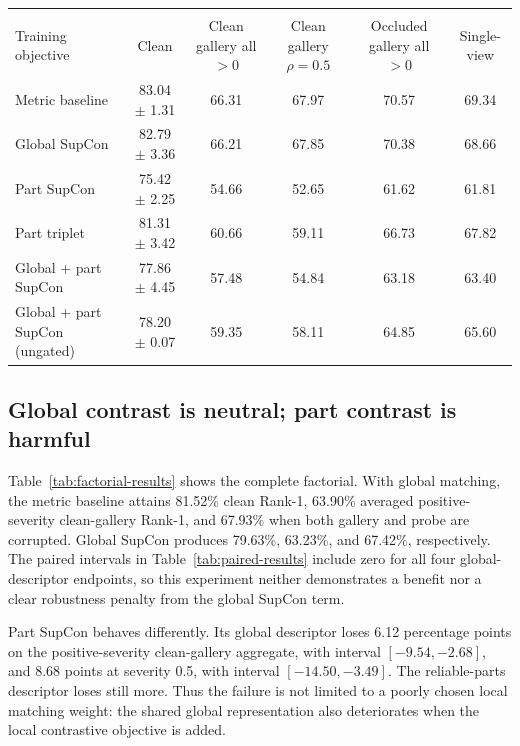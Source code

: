 \documentclass[runningheads]{llncs}
\begin{document}
\begin{table}[!t]
\begin{tabularx}{\textwidth}{@{}>{\raggedright\arraybackslash}Xccccc@{}}
\toprule
\multicolumn{6}{@{}l}{\emph{Reliable-parts descriptor}} \\
Training objective & Clean & \shortstack{Clean gallery\\all $>0$} &
\shortstack{Clean gallery\\$\rho=0.5$} & \shortstack{Occluded gallery\\all $>0$} &
Single-view \\
\midrule
Metric baseline & 83.04 $\pm$ 1.31 & 66.31 & 67.97 & 70.57 & 69.34 \\
Global SupCon & 82.79 $\pm$ 3.36 & 66.21 & 67.85 & 70.38 & 68.66 \\
Part SupCon & 75.42 $\pm$ 2.25 & 54.66 & 52.65 & 61.62 & 61.81 \\
Part triplet & 81.31 $\pm$ 3.42 & 60.66 & 59.11 & 66.73 & 67.82 \\
Global + part SupCon & 77.86 $\pm$ 4.45 & 57.48 & 54.84 & 63.18 & 63.40 \\
Global + part SupCon (ungated) & 78.20 $\pm$ 0.07 & 59.35 & 58.11 & 64.85 & 65.60 \\
\bottomrule
\end{tabularx}
\end{table}

\subsection{Global contrast is neutral; part contrast is harmful}

Table~\ref{tab:factorial-results} shows the complete factorial. With global
matching, the metric baseline attains 81.52\% clean Rank-1, 63.90\% averaged
positive-severity clean-gallery Rank-1, and 67.93\% when both gallery and probe
are corrupted. Global SupCon produces 79.63\%, 63.23\%, and 67.42\%,
respectively. The paired intervals in Table~\ref{tab:paired-results} include
zero for all four global-descriptor endpoints, so this experiment neither
demonstrates a benefit nor a clear robustness penalty from the global SupCon
term.

Part SupCon behaves differently. Its global descriptor loses 6.12 percentage
points on the positive-severity clean-gallery aggregate, with interval
$[-9.54,-2.68]$, and 8.68 points at severity 0.5, with interval
$[-14.50,-3.49]$. The reliable-parts descriptor loses still more. Thus the
failure is not limited to a poorly chosen local matching weight: the shared
global representation also deteriorates when the local contrastive objective is
added.
\end{document}
